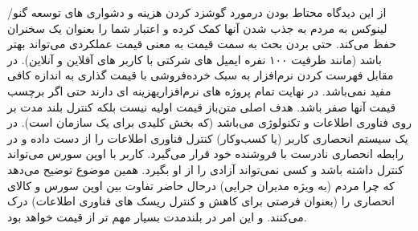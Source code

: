 
از این دیدگاه محتاط بودن درمورد گوشزد کردن هزینه و دشواری های توسعه گنو/لینوکس
به مردم به جذب شدن آنها کمک کرده و اعتبار شما را بعنوان یک سخنران حفظ می‌کند.
حتی بردن بحث به سمت قیمت به معنی قیمت عملکردی می‌تواند بهتر باشد
(مانند ظرفیت ۱۰۰ نفره ایمیل های شرکتی با کاربر های آفلاین و آنلاین).
در مقابل فهرست کردن نرم‌افزار به سبک خرده‌فروشی با قیمت گذاری به اندازه کافی مفید نمی‌باشد.
در نهایت تمام پروژه های نرم‌افزاریهزینه ای دارند حتی اگر برچسب قیمت آنها صفر باشد.
هدف اصلی متن‌باز قیمت اولیه نیست بلکه کنترل بلند مدت بر روی فناوری اطلاعات و تکنولوژی می‌باشد
(که بخش کلیدی برای یک سازمان است). در یک سیستم انحصاری کاربر (یا کسب‌و‌کار) کنترل فناوری اطلاعات
را از دست داده و در رابطه انحصاری نادرست با فروشنده خود قرار می‌گیرد.
کاربر با اوپن سورس می‌تواند کنترل داشته باشد و کسی نمی‌تواند آزادی را از او بگیرد.
همین موضوع توضیح می‌دهد که چرا مردم (به ویژه مدیران جرایی) درحال حاضر تفاوت بین 
اوپن سورس و کالای انحصاری را (بعنوان فرصتی برای کاهش و کنترل ریسک های فناوری اطلاعات)
درک می‌کنند. و این امر در بلندمدت بسیار مهم تر از قیمت خواهد بود.

